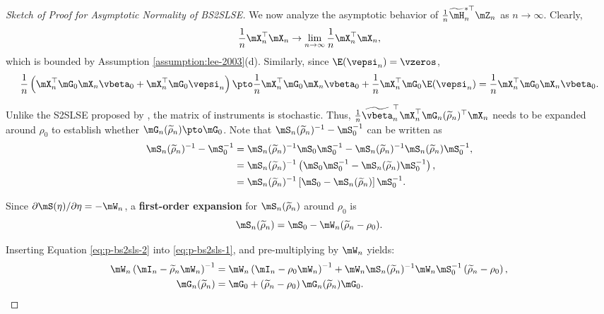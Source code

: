 \documentclass[english,12pt]{book}\usepackage[]{graphicx}\usepackage[]{xcolor}
\begin{document}
\begin{proof}[Sketch of Proof for Asymptotic Normality of BS2SLSE]
We now analyze the asymptotic behavior of $\frac{1}{n}\widetilde{\mH}^{*\top}_n \mZ_n$ as $n\to\infty$. Clearly, 
\begin{equation*}
 \frac{1}{n}\mX_n^\top\mX_n \to \lim_{n\to\infty}\frac{1}{n}\mX_n^\top\mX_n, 
\end{equation*}
%
which is bounded by Assumption \ref{assumption:lee-2003}(d). Similarly, since $\E(\vepsi_n) = \vzeros$,  
\begin{equation*}
\frac{1}{n}\left(\mX_n^\top\mG_0\mX_n\vbeta_0 + \mX_n^\top\mG_0\vepsi_n\right)\pto \frac{1}{n}\mX_n^\top\mG_0\mX_n\vbeta_0 + \frac{1}{n}\mX_n^\top\mG_0\E(\vepsi_n) = \frac{1}{n}\mX_n^\top\mG_0\mX_n\vbeta_0.
\end{equation*}

Unlike the S2SLSE proposed by \cite{kelejian1998generalized}, the matrix of instruments is stochastic. Thus,  $\frac{1}{n}\widetilde{\vbeta}^\top_n\mX_n^\top \mG_n(\widetilde{\rho}_n)^\top\mX_n$ needs to be expanded around $\rho_0$ to establish whether $\mG_n(\widetilde{\rho}_n)\pto \mG_0$. Note that $\mS_n(\widetilde{\rho}_n)^{-1} - \mS_0^{-1}$ can be written as
\begin{equation}\label{eq:p-bs2sls-1}
\begin{aligned}
\mS_n(\widetilde{\rho}_n)^{-1} - \mS_0^{-1} & = \mS_n(\widetilde{\rho}_n)^{-1}\mS_0\mS_0^{-1} - \mS_n(\widetilde{\rho}_n)^{-1}\mS_n(\widetilde{\rho}_n)\mS_0^{-1}, \\
    & = \mS_n(\widetilde{\rho}_n)^{-1}\left(\mS_0\mS_0^{-1} - \mS_n(\widetilde{\rho}_n)\mS_0^{-1}\right), \\
    & = \mS_n(\widetilde{\rho}_n)^{-1}\left[\mS_0 - \mS_n(\widetilde{\rho}_n)\right]\mS_0^{-1}.
\end{aligned}
\end{equation}

Since $\partial \mS(\eta) /\partial \eta = -\mW_n$, a \textbf{first-order expansion} for $\mS_n(\widetilde{\rho}_n)$ around $\rho_0$ is
\begin{equation}\label{eq:p-bs2sls-2}
\mS_n(\widetilde{\rho}_n) = \mS_0 - \mW_n(\widetilde{\rho}_n - \rho_0).
\end{equation}

Inserting Equation \eqref{eq:p-bs2sls-2} into \eqref{eq:p-bs2sls-1}, and pre-multiplying by $\mW_n$ yields:
\begin{equation*}
\begin{aligned}
\mW_n\left(\mI_n - \widetilde{\rho}_n\mW_n\right)^{-1} & = \mW_n\left(\mI_n - \rho_0\mW_n\right)^{-1} + \mW_n\mS_n(\widetilde{\rho}_n)^{-1}\mW_n\mS_0^{-1}\left(\widetilde{\rho}_n - \rho_0\right), \\
\mG_n(\widetilde{\rho}_n) & = \mG_0 + \left(\widetilde{\rho}_n - \rho_0\right)\mG_{n}(\widetilde{\rho}_n)\mG_0.
\end{aligned}
\end{equation*}


\end{proof}
\end{document}
